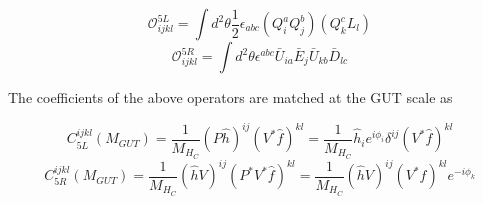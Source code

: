 \documentclass[aps,onecolumn,twoside,secnumarabic,balancelastpage,amsmath,amssymb,nofootinbib,hyperref=pdftex]{revtex4}
\begin{document}
\begin{equation}
\mathcal{O}^{5L}_{ijkl} = \int d^{2}\theta \frac{1}{2}\epsilon_{abc}(Q^{a}_{i}Q^{b}_{j})(Q^{c}_{k}L_{l})
\end{equation}
\begin{equation}
\mathcal{O}^{5R}_{ijkl} = \int d^{2}\theta \epsilon^{abc}\bar{U}_{ia}\bar{E}_{j}\bar{U}_{kb}\bar{D}_{lc}
\end{equation}

The coefficients of the above operators are matched at the GUT scale as

\begin{equation}
C^{ijkl}_{5L}(M_{GUT}) = \frac{1}{M_{H_{C}}}(P\hat{h})^{ij}(V^{*}\hat{f})^{kl} = \frac{1}{M_{H_{C}}}\hat{h}_{i}e^{i\phi_{i}}\delta^{ij}(V^{*}\hat{f})^{kl}
\end{equation}
\begin{equation}
C^{ijkl}_{5R}(M_{GUT}) = \frac{1}{M_{H_{C}}}(\hat{h}V)^{ij}(P^{*}V^{*}\hat{f})^{kl} = \frac{1}{M_{H_{C}}}(\hat{h}V)^{ij}(V^{*}\hat{f})^{kl}e^{-i\phi_{k}}
\end{equation}
\end{document}
